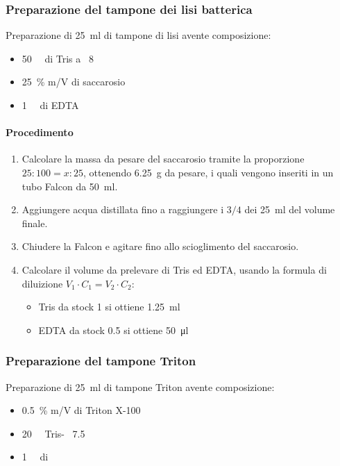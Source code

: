 \subsubsection{Preparazione del tampone dei lisi batterica}
\noindent Preparazione di \qty{25}{\ml} di tampone di lisi avente composizione:
\begin{itemize}[person]
	\item \qty{50}{\milli\Molar} di Tris a \pH\ 8
	\item \qty{25}{\percent} m/V di saccarosio
	\item \qty{1}{\milli\Molar} di EDTA
\end{itemize}

\paragraph{Procedimento}
\begin{enumerate}
	\item Calcolare la massa da pesare del saccarosio tramite la proporzione \(25:100=x:25\), ottenendo \qty{6.25}{\g} da pesare, i quali vengono inseriti in un tubo Falcon da \qty{50}{\ml}.
	\item Aggiungere acqua distillata fino a raggiungere i \(3/4\) dei \qty{25}{\ml} del volume finale.
	\item Chiudere la Falcon e agitare fino allo scioglimento del saccarosio.
	\item Calcolare il volume da prelevare di Tris ed EDTA, usando la formula di diluizione \mbox{\(V_1\cdot C_1 = V_2\cdot C_2\)}:
	      \begin{itemize}[person]
		      \item Tris da stock \qty{1}{\Molar} si ottiene \qty{1.25}{\ml}
		      \item EDTA da stock \qty{0.5}{\Molar} si ottiene \qty{50}{\micro\litre}
	      \end{itemize}
\end{enumerate}

\subsubsection{Preparazione del tampone Triton}
\noindent Preparazione di \qty{25}{\ml} di tampone Triton avente composizione:
\begin{itemize}[person]
	\item \qty{0.5}{\percent} m/V di Triton X-100
	\item \qty{20}{\milli\Molar} Tris- \pH\ \num{7.5}
	\item \qty{1}{\milli\Molar} di 
\end{itemize}

